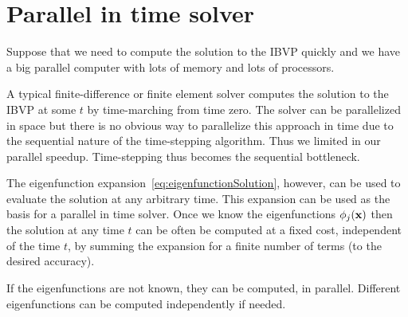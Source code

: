 \section{Parallel in time solver} 

Suppose that we need to compute the solution to the IBVP quickly and we have a big parallel computer
with lots of memory and lots of processors. 

A typical finite-difference or finite element solver computes the solution to the IBVP at some $t$ 
by time-marching from time zero. The solver can be parallelized in space but there is no
obvious way to parallelize this approach in time due to the sequential nature of the time-stepping
algorithm. Thus we limited in our parallel speedup. Time-stepping thus becomes the sequential bottleneck.

The eigenfunction expansion~\eqref{eq:eigenfunctionSolution}, however, can be used to evaluate
the solution at any arbitrary time.
This expansion can be used as the basis for
a parallel in time solver. Once we know the eigenfunctions $\phi_j(\mathbf{ x})$ then 
the solution at any time $t$ can be often be computed at a fixed cost, independent of the time $t$,
by summing the expansion for a finite number of terms (to the desired accuracy).

If the eigenfunctions are not known, they can be computed, in parallel.  
Different eigenfunctions can be computed independently if needed.